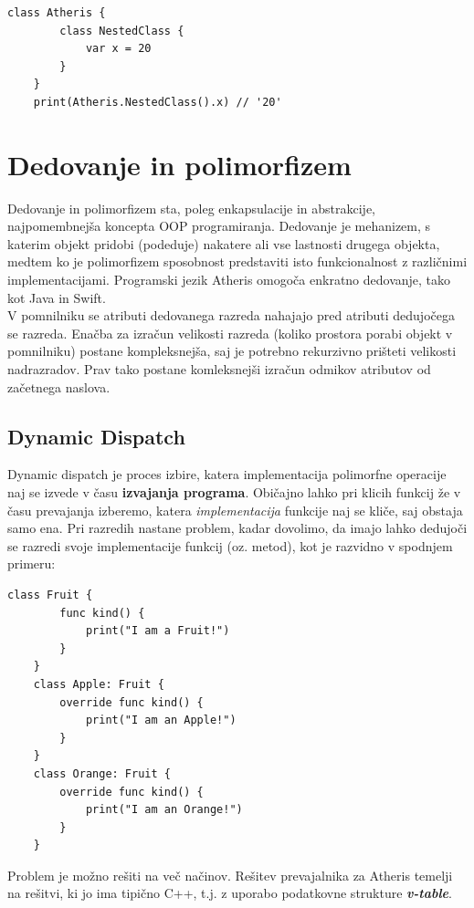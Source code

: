 \documentclass[a4paper, 12pt]{book}
\begin{document}
\begin{lstlisting}[caption={Gnezden razred}, captionpos=b]
	class Atheris {
	    class NestedClass {
	        var x = 20
	    }
	}
	print(Atheris.NestedClass().x) // '20'
\end{lstlisting}
\newpage

\section{Dedovanje in polimorfizem}

Dedovanje in polimorfizem sta, poleg enkapsulacije in abstrakcije, najpomembnejša koncepta OOP programiranja. Dedovanje je mehanizem, s katerim objekt pridobi (podeduje) nakatere ali vse lastnosti drugega objekta, medtem ko je polimorfizem sposobnost predstaviti isto funkcionalnost z različnimi implementacijami. Programski jezik Atheris omogoča enkratno dedovanje, tako kot Java in Swift. \\
\indent V pomnilniku se atributi dedovanega razreda nahajajo pred atributi dedujočega se razreda. Enačba za izračun velikosti razreda (koliko prostora porabi objekt v pomnilniku) postane kompleksnejša, saj je potrebno rekurzivno prišteti velikosti nadrazradov. Prav tako postane komleksnejši izračun odmikov atributov od začetnega naslova. 

\subsection{Dynamic Dispatch} \label{dynamicDispatch}

Dynamic dispatch je proces izbire, katera implementacija polimorfne operacije naj se izvede v času \textbf{izvajanja programa}. Običajno lahko pri klicih funkcij že v času prevajanja izberemo, katera \textit{implementacija} funkcije naj se kliče, saj obstaja samo ena. Pri razredih nastane problem, kadar dovolimo, da imajo lahko dedujoči se razredi svoje implementacije funkcij (oz. metod), kot je razvidno v spodnjem primeru: 

\begin{lstlisting}[caption={Več implementacij za isto funkcionalnost}, captionpos=b]
	class Fruit {
	    func kind() {
	        print("I am a Fruit!")
	    }
	}
	class Apple: Fruit {
	    override func kind() {
	        print("I am an Apple!")
	    }
	}
	class Orange: Fruit {
	    override func kind() {
	        print("I am an Orange!")
	    }
	}
\end{lstlisting}

\indent Problem je možno rešiti na več načinov. Rešitev prevajalnika za Atheris temelji na rešitvi, ki jo ima tipično C++, t.j. z uporabo podatkovne strukture \textit{\textbf{v-table}}. 
\end{document}
